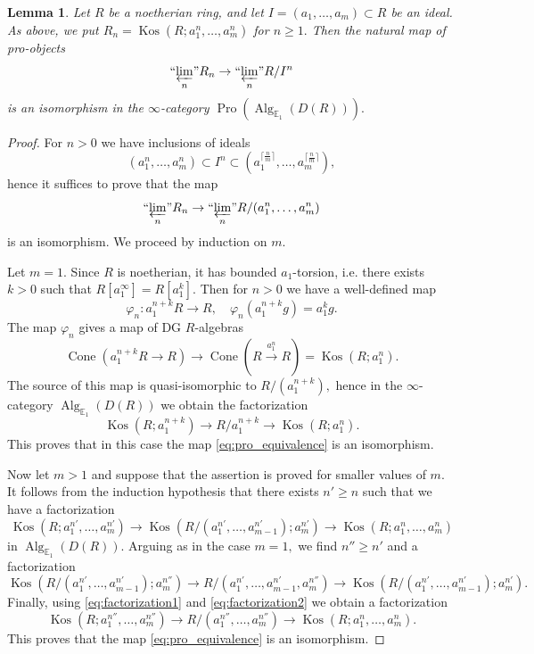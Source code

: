 \documentclass[11pt,leqno]{amsart}
\newtheorem{lemma}[theo]{Lemma}
\numberwithin{equation}{section}
\newcommand{\prolim}[1][]{\mathop{\varprojlim}\limits_{#1}}
\newcommand{\proolim}[1][]{{``{\prolim[#1]}"}}
\newcommand{\xto}{\xrightarrow}
\newcommand{\Cone}{\operatorname{Cone}}
\newcommand{\bE}{{\mathbb E}}
\newcommand{\Kos}{\operatorname{Kos}}
\newcommand{\Pro}{\operatorname{Pro}}
\newcommand{\Alg}{\operatorname{Alg}}
\begin{document}
\begin{lemma}\label{lem:pro_equivalence_noetherian} Let $R$ be a noetherian ring, and let $I=(a_1,\dots,a_m)\subset R$ be an ideal. As above, we put $R_n=\Kos(R;a_1^n,\dots,a_m^n)$ for $n\geq 1.$
Then the natural map of pro-objects $$\proolim[n]R_n\to \proolim[n]R/I^n$$ is an isomorphism in the $\infty$-category $\Pro(\Alg_{\bE_1}(D(R))).$\end{lemma}

\begin{proof}
	For $n>0$ we have inclusions of ideals $$(a_1^n,\dots,a_m^n)\subset I^n\subset (a_1^{\lceil \frac{n}{m}\rceil},\dots,a_m^{\lceil \frac{n}{m}\rceil}),$$
	hence it suffices to prove that the map
	\begin{equation}\label{eq:pro_equivalence}
		\proolim[n] R_n\to \proolim[n]R/(a_1^n,\dots,a_m^n)
	\end{equation}
	is an isomorphism. We proceed by induction on $m.$
	
	Let $m=1.$ Since $R$ is noetherian, it has bounded $a_1$-torsion, i.e. there exists $k>0$ such that $R[a_1^{\infty}]=R[a_1^k].$ Then for $n>0$ we have a well-defined map 
	\begin{equation*}
		\varphi_n:a_1^{n+k}R\to R,\quad \varphi_n(a_1^{n+k}g)=a_1^k g. 
	\end{equation*}
	The map $\varphi_n$ gives a map of DG $R$-algebras
	\begin{equation*}
		\Cone(a_1^{n+k}R\to R)\to \Cone(R\xto{a_1^n}R)=\Kos(R;a_1^n).
	\end{equation*}
	The source of this map is quasi-isomorphic to $R/(a_1^{n+k}),$ hence in the $\infty$-category $\Alg_{\bE_1}(D(R))$ we obtain the factorization
	\begin{equation*}
		\Kos(R;a_1^{n+k})\to R/a_1^{n+k}\to \Kos(R;a_1^n).
	\end{equation*}
	This proves that in this case the map \eqref{eq:pro_equivalence} is an isomorphism.
	
	Now let $m>1$ and suppose that the assertion is proved for smaller values of $m.$ It follows from the induction hypothesis that there exists $n'\geq n$ such that we have a factorization
	\begin{equation}\label{eq:factorization1}
		\Kos(R;a_1^{n'},\dots,a_m^{n'})\to \Kos(R/(a_1^{n'},\dots,a_{m-1}^{n'});a_m^{n'})\to \Kos(R;a_1^{n},\dots,a_m^{n})
	\end{equation}
	in $\Alg_{\bE_1}(D(R)).$ Arguing as in the case $m=1,$ we find $n''\geq n'$ and a factorization
	\begin{equation}\label{eq:factorization2}
		\Kos(R/(a_1^{n'},\dots,a_{m-1}^{n'});a_m^{n''})\to R/(a_1^{n'},\dots,a_{m-1}^{n'},a_m^{n''}) \to \Kos(R/(a_1^{n'},\dots,a_{m-1}^{n'});a_m^{n'}).
	\end{equation}
	Finally, using \eqref{eq:factorization1} and \eqref{eq:factorization2} we obtain a factorization
	\begin{equation*}
		\Kos(R;a_1^{n''},\dots,a_m^{n''})\to R/(a_1^{n''},\dots,a_m^{n''})\to \Kos(R;a_1^{n},\dots,a_m^{n}).
	\end{equation*}
	This proves that the map \eqref{eq:pro_equivalence} is an isomorphism.
\end{proof}
\end{document}
